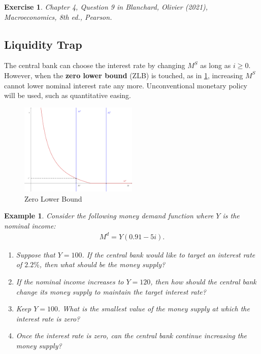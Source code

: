 \documentclass[12pt]{article}
\newtheorem{example}{Example}
\newtheorem{exercise}{Exercise}
\begin{document}
\begin{exercise}
	Chapter 4, Question 9 in Blanchard, Olivier (2021), \textit{Macroeconomics}, 8th ed., Pearson.
\end{exercise}

\subsection*{Liquidity Trap}
The central bank can choose the interest rate by changing $M^S$ as long as $i\geq 0$. However, when the \textbf{zero lower bound} (ZLB) is touched, as in \ref{fig:zlb}, increasing $M^S$ cannot lower nominal interest rate any more. Unconventional monetary policy will be used, such as quantitative easing.

\begin{figure}[htp]
    \centering
    \includegraphics[width=0.5\textwidth]{zlb.png}
    \caption{Zero Lower Bound}
    \label{fig:zlb}
\end{figure}

\begin{example}
	Consider the following money demand function where $Y$ is the nominal income:
	\begin{align*}
		M^d = Y (0.91-5i).
	\end{align*}
	
	\begin{enumerate}[label=(\alph*)]
		\item Suppose that $Y=100$. If the central bank would like to target an interest rate of $2.2\%$, then what should be the money supply?
		\vspace{36pt}
		\item If the nominal income increases to $Y=120$, then how should the central bank change its money supply to maintain the target interest rate?
		\vspace{36pt}
		\item Keep $Y=100$. What is the smallest value of the money supply at which the interest rate is zero?
		\vspace{36pt}
		\item Once the interest rate is zero, can the central bank continue increasing the money supply?
	\end{enumerate}
\end{example}
\end{document}
